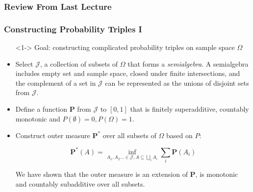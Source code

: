 \documentclass[handout]{beamer}
\newcommand{\BP}{\mathbf{P}}
\begin{document}
\subsubsection{Review From Last Lecture }
\frame
{
  \frametitle{Constructing Probability Triples I }

   \begin{itemize}

      
       \item[] <1->  Goal:  constructing complicated probability triples on sample space $\Omega$
       
              \item <1->[1)]  Select $\mathcal{J}$, a collection of subsets of $\Omega$ that forms a \textit{semialgebra}. A semialgebra includes empty set and sample space, closed under finite intersections, and the complement of a set in $\mathcal{J}$ can be represented as the unions of disjoint sets from $\mathcal{J}$.
               \item <1->[2)]  Define a function $\mathbf{P}$ from $\mathcal{J}$ to $[0,1]$ that is finitely superadditive, countably monotonic and $P(\emptyset)=0, P(\Omega)=1$.
               \item <2-> [3)]   Construct outer measure $\BP^*$ over all subsets of $\Omega$ based on $P$:
               
    $$\BP^*(A)=\inf_{A_1,A_2\ldots \in \mathcal{J}, A\subseteq \bigcup_i A_i} \sum_i \BP(A_i) $$

               We have shown that the outer measure is an extension of $\mathbf{P}$, is monotonic and countably subadditive over all subsets.
               
              
                 \end{itemize}
}
\end{document}
